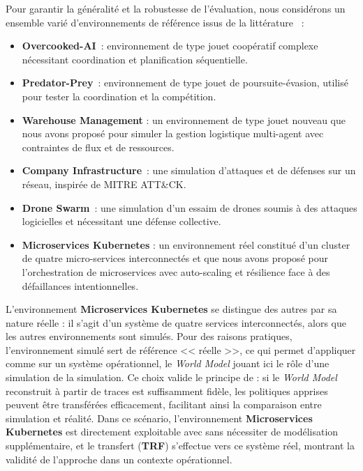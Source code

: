 Pour garantir la généralité et la robustesse de l'évaluation, nous considérons un ensemble varié d'environnements de référence issus de la littérature ~:
\begin{itemize}
  \item \textbf{Overcooked-AI}~\cite{overcookedai}: environnement de type jouet coopératif complexe nécessitant coordination et planification séquentielle.
  \item \textbf{Predator-Prey}~\cite{lowe2017multi}: environnement  de type jouet de poursuite-évasion, utilisé pour tester la coordination et la compétition.
  \item \textbf{Warehouse Management} : un environnement  de type jouet nouveau que nous avons proposé pour simuler la gestion logistique multi-agent avec contraintes de flux et de ressources.
  \item \textbf{Company Infrastructure}~\cite{cyberbattlesim}: une simulation d'attaques et de défenses sur un réseau, inspirée de MITRE ATT\&CK.
  \item \textbf{Drone Swarm}~\cite{cage_challenge_3_announcement}: une simulation d'un essaim de drones soumis à des attaques logicielles et nécessitant une défense collective.
  \item \textbf{Microservices Kubernetes} : un environnement réel constitué d'un cluster de quatre micro-services interconnectés et que nous avons proposé pour l'orchestration de microservices avec auto-scaling et résilience face à des défaillances intentionnelles.
\end{itemize}

L'environnement \textbf{Microservices Kubernetes} se distingue des autres par sa nature réelle : il s'agit d'un système de quatre services interconnectés, alors que les autres environnements sont simulés. Pour des raisons pratiques, l'environnement simulé sert de référence << réelle >>, ce qui permet d'appliquer  comme sur un système opérationnel, le \textit{World Model} jouant ici le rôle d'une simulation de la simulation. Ce choix valide le principe de  : si le \textit{World Model} reconstruit à partir de traces est suffisamment fidèle, les politiques apprises peuvent être transférées efficacement, facilitant ainsi la comparaison entre simulation et réalité. Dans ce scénario, l'environnement \textbf{Microservices Kubernetes} est directement exploitable avec  sans nécessiter de modélisation supplémentaire, et le transfert (\textbf{TRF}) s'effectue vers ce système réel, montrant la validité de l'approche dans un contexte opérationnel.

